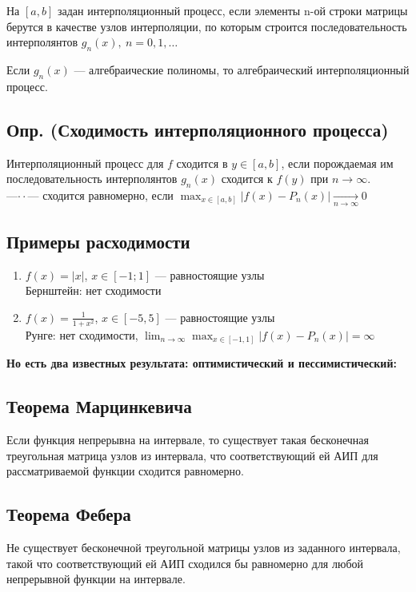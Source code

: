 На $[a, b]$ задан интерполяционный процесс, если элементы n-ой строки матрицы берутся в качестве узлов интерполяции, по которым строится последовательность интерполянтов $g_n(x), ~ n = 0,1,\ldots$

Если $g_n(x)$ — алгебраические полиномы, то алгебраический интерполяционный процесс.

\subsection*{Опр. (Сходимость интерполяционного процесса)}
Интерполяционный процесс для $f$ сходится в $y \in [a, b]$, если порождаемая им последовательность интерполянтов $g_n(x)$ сходится к $f(y)$ при $n \to \infty$. \\
---$\cdot \cdot$--- сходится равномерно, если $\max_{x \in [a, b]} |f(x) - P_n(x)| \xrightarrow[n \to \infty]{} 0$

\subsection*{Примеры расходимости}

\begin{enumerate}
    \item $f(x) = |x|$, $x \in [-1;1]$ --- равностоящие узлы \\
    Бернштейн: нет сходимости
    \item $f(x) = \frac{1}{1 + x^2}$, $x \in [-5, 5]$ --- равностоящие узлы \\
    Рунге: нет сходимости, $\lim_{n \to \infty} \max_{x \in [-1, 1]} |f(x) - P_n(x)| = \infty$
\end{enumerate}

\textbf{Но есть два известных результата: оптимистический и пессимистический:}

\subsection*{Теорема Марцинкевича}
Если функция непрерывна на интервале, то существует такая бесконечная треугольная матрица узлов из интервала, что соответствующий ей АИП для рассматриваемой функции сходится равномерно.

\subsection*{Теорема Фебера}
Не существует бесконечной треугольной матрицы узлов из заданного интервала, такой что соответствующий ей АИП сходился бы равномерно для любой непрерывной функции на интервале.

